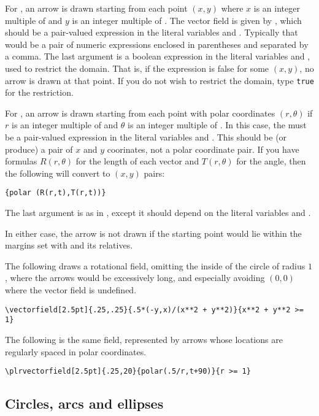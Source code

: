 \documentclass[letterpaper]{article}
\begin{document}
For , an arrow is drawn starting from each point $(x,y)$
where $x$ is an integer multiple of  and $y$ is an integer
multiple of . The vector field is given by ,
which should be a pair-valued expression in the literal variables
 and . Typically that would be a pair of numeric
expressions enclosed in parentheses and separated by a comma. The last
argument is a boolean expression in the literal variables  and
, used to restrict the domain. That is, if the expression is
false for some $(x,y)$, no arrow is drawn at that point. If you do not
wish to restrict the domain, type \texttt{true} for the restriction.

For , an arrow is drawn starting from each point with
polar coordinates $(r,\theta)$ if $r$ is an integer multiple of
 and $\theta$ is an integer multiple of . In this
case, the  must be a pair-valued expression in the literal
variables  and . This should be (or produce) a pair of $x$
and $y$ coorinates, not a polar coordinate pair. If you have formulas
$R(r,\theta)$ for the length of each vector and $T(r,\theta)$ for the
angle, then the following will convert to $(x,y)$ pairs:
\begin{verbatim}
{polar (R(r,t),T(r,t))}
\end{verbatim}
The last argument is as in , except it should depend on
the literal variables  and .

In either case, the arrow is not drawn if the starting point would lie
within the margins set with  and its relatives.

The following draws a rotational field, omitting the inside of the
circle of radius $1$, where the arrows would be excessively long, and
especially avoiding $(0,0)$ where the vector field is undefined.
\begin{verbatim}
\vectorfield[2.5pt]{.25,.25}{.5*(-y,x)/(x**2 + y**2)}{x**2 + y**2 >= 1}
\end{verbatim}
The following is the same field, represented by arrows whose locations
are regularly spaced in polar coordinates.
\begin{verbatim}
\plrvectorfield[2.5pt]{.25,20}{polar(.5/r,t+90)}{r >= 1}
\end{verbatim}


\subsection{Circles, arcs and ellipses}\label{circles}
\end{document}
